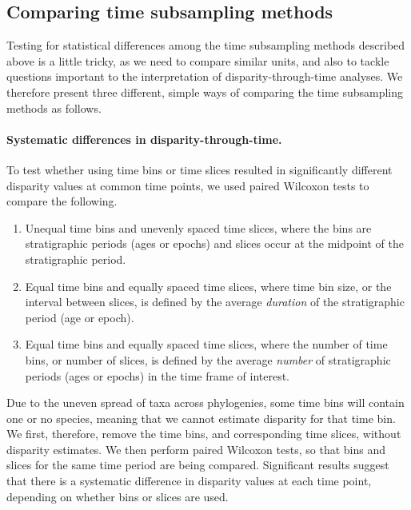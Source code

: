 \documentclass[12pt,a4paper]{article}
\begin{document}
\subsection{Comparing time subsampling methods}
\label{testing}
Testing for statistical differences among the time subsampling methods described above is a little tricky, as we need to compare similar units, and also to tackle questions important to the interpretation of disparity-through-time analyses. 
We therefore present three different, simple ways of comparing the time subsampling methods as follows.

\paragraph{Systematic differences in disparity-through-time.} 
To test whether using time bins or time slices resulted in significantly different disparity values at common time points, we used paired Wilcoxon tests to compare the following. 

\begin{enumerate}
  \item Unequal time bins and unevenly spaced time slices, where the bins are stratigraphic periods (ages or epochs) and slices occur at the midpoint of the stratigraphic period.
  \item Equal time bins and equally spaced time slices, where time bin size, or the interval between slices, is defined by the average \textit{duration} of the stratigraphic period (age or epoch).
  \item Equal time bins and equally spaced time slices, where the number of time bins, or number of slices, is defined by the average \textit{number} of stratigraphic periods (ages or epochs) in the time frame of interest.
\end{enumerate}

Due to the uneven spread of taxa across phylogenies, some time bins will contain one or no species, meaning that we cannot estimate disparity for that time bin. 
We first, therefore, remove the time bins, and corresponding time slices, without disparity estimates. 
We then perform paired Wilcoxon tests, so that bins and slices for the same time period are being compared. 
Significant results suggest that there is a systematic difference in disparity values at each time point, depending on whether bins or slices are used.
\end{document}
